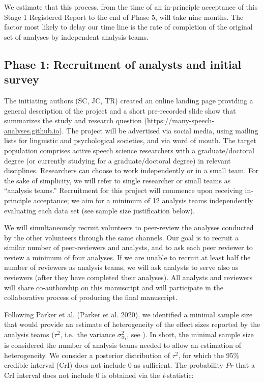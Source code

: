 \documentclass[
  12pt,
]{article}
\begin{document}
We estimate that this process, from the time of an in-principle acceptance of this Stage 1 Registered Report to the end of Phase 5, will take nine months.
The factor most likely to delay our time line is the rate of completion of the original set of analyses by independent analysis teams.

\hypertarget{phase-1-recruitment-of-analysts-and-initial-survey}{%
\subsection{Phase 1: Recruitment of analysts and initial survey}\label{phase-1-recruitment-of-analysts-and-initial-survey}}

The initiating authors (SC, JC, TR) created an online landing page providing a general description of the project and a short pre-recorded slide show that summarizes the study and research question (\url{https://many-speech-analyses.github.io}).
The project will be advertised via social media, using mailing lists for linguistic and psychological societies, and via word of mouth.
The target population comprises active speech science researchers with a graduate/doctoral degree (or currently studying for a graduate/doctoral degree) in relevant disciplines.
Researchers can choose to work independently or in a small team.
For the sake of simplicity, we will refer to single researcher or small teams as ``analysis teams.''
Recruitment for this project will commence upon receiving in-principle acceptance; we aim for a minimum of 12 analysis teams independently evaluating each data set (see sample size justification below).

We will simultaneously recruit volunteers to peer-review the analyses conducted by the other volunteers through the same channels.
Our goal is to recruit a similar number of peer-reviewers and analysts, and to ask each peer reviewer to review a minimum of four analyses.
If we are unable to recruit at least half the number of reviewers as analysis teams, we will ask analysts to serve also as reviewers (after they have completed their analyses).
All analysts and reviewers will share co-authorship on this manuscript and will participate in the collaborative process of producing the final manuscript.

Following Parker et al. (Parker et al. 2020), we identified a minimal sample size that would provide an estimate of heterogeneity of the effect sizes reported by the analysis teams (\(\tau^2\), i.e.~the variance \(\sigma^2_{\alpha_{\text{t}}}\), see ).
In short, the minimal sample size is considered the number of analysis teams needed to allow an estimation of heterogeneity.
We consider a posterior distribution of \(\tau^2\), for which the 95\% credible interval (CrI) does not include 0 as sufficient.
The probability \(Pr\) that a CrI interval does not include 0 is obtained via the \emph{t}-statistic:
\end{document}
